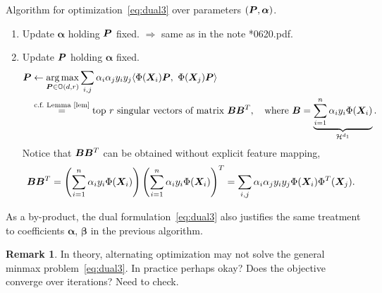 \documentclass[11pt]{article}
\theoremstyle{plain}
\theoremstyle{definition}
\newtheorem{rmk}{Remark}
\newcommand*{\KeepStyleUnderBrace}[1]{%
  \mathop{%
    \mathchoice
    {\underbrace{\displaystyle#1}}%
    {\underbrace{\textstyle#1}}%
    {\underbrace{\scriptstyle#1}}%
    {\underbrace{\scriptscriptstyle#1}}%
  }\limits
}
\begin{document}
Algorithm for optimization~\eqref{eq:dual3} over parameters $(\bm{P},\boldsymbol{\alpha})$.
\begin{enumerate}
\item Update $\boldsymbol{\alpha}$ holding $\bm{P}$ fixed. $\Longrightarrow$  same as in the note *0620.pdf.

\item Update $\bm{P}$ holding $\boldsymbol{\alpha}$ fixed. 
\begin{align}
\mP&\leftarrow\argmax_{\mP\in\mathbb{O}(d,r)} \sum_{i,j}\alpha_i\alpha_jy_iy_j\langle \Phi(\mX_i)\mP,\ \Phi(\mX_j)\mP\rangle \\
&\stackrel{\text{c.f.\ Lemma~\ref{lem}}}{=}\text{top $r$ singular vectors of matrix }\mB\mB^T,\quad \text{where}\ \mB=\KeepStyleUnderBrace{\sum_{i=1}^n\alpha_iy_i\Phi(\mX_i)}_{\tH^{d_1}}.
\end{align}
Notice that $\bm B\bm B^T$ can be obtained without explicit feature mapping,
\begin{equation}
\bm B\bm B^T = \left(\sum_{i=1}^n\alpha_iy_i\Phi(\bm X_i)\right)\left(\sum_{i=1}^n\alpha_iy_i\Phi(\bm X_i)\right)^T=\sum_{i,j}\alpha_i\alpha_jy_iy_j\Phi(\bm X_i)\Phi^T(\bm X_j).
\end{equation}
\end{enumerate}

As a by-product, the dual formulation~\eqref{eq:dual3} also justifies the same treatment to coefficients $\boldsymbol{\alpha}$, $\boldsymbol{\beta}$ in the previous algorithm. 

\begin{rmk}
In theory, alternating optimization may not solve the general minmax problem~\eqref{eq:dual3}. In practice perhaps okay? Does the objective converge over iterations? Need to check. 
\end{rmk}
\end{document}

